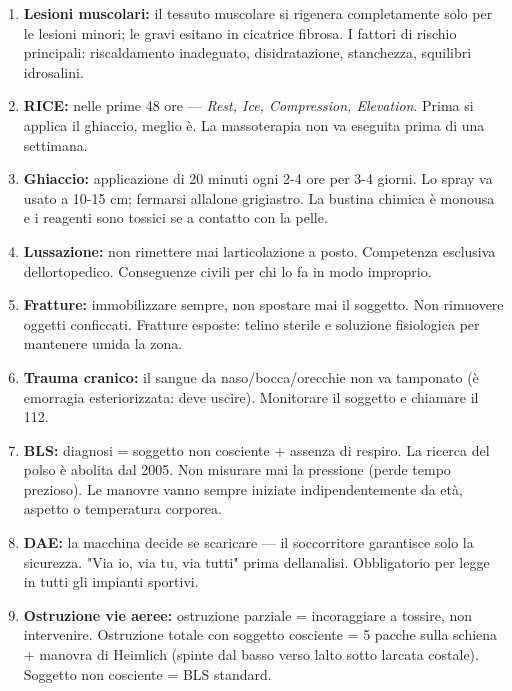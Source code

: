 \documentclass[a4paper,11pt]{article}
\begin{document}
\begin{enumerate}
      \item
            \textbf{Lesioni muscolari:} il tessuto muscolare si rigenera
            completamente solo per le lesioni minori; le gravi esitano in
            cicatrice fibrosa. I fattori di rischio principali: riscaldamento
            inadeguato, disidratazione, stanchezza, squilibri idrosalini.
      \item
            \textbf{RICE:} nelle prime 48 ore --- \emph{Rest, Ice, Compression,
                  Elevation}. Prima si applica il ghiaccio, meglio è. La massoterapia
            non va eseguita prima di una settimana.
      \item
            \textbf{Ghiaccio:} applicazione di 20 minuti ogni 2-4 ore per 3-4
            giorni. Lo spray va usato a 10-15 cm; fermarsi
            all\textquotesingle alone grigiastro. La bustina chimica è monousa e i
            reagenti sono tossici se a contatto con la pelle.
      \item
            \textbf{Lussazione:} non rimettere mai l\textquotesingle articolazione
            a posto. Competenza esclusiva dell\textquotesingle ortopedico.
            Conseguenze civili per chi lo fa in modo improprio.
      \item
            \textbf{Fratture:} immobilizzare sempre, non spostare mai il soggetto.
            Non rimuovere oggetti conficcati. Fratture esposte: telino sterile e
            soluzione fisiologica per mantenere umida la zona.
      \item
            \textbf{Trauma cranico:} il sangue da naso/bocca/orecchie non va
            tamponato (è emorragia esteriorizzata: deve uscire). Monitorare il
            soggetto e chiamare il 112.
      \item
            \textbf{BLS:} diagnosi = soggetto non cosciente + assenza di respiro.
            La ricerca del polso è abolita dal 2005. Non misurare mai la pressione
            (perde tempo prezioso). Le manovre vanno sempre iniziate
            indipendentemente da età, aspetto o temperatura corporea.
      \item
            \textbf{DAE:} la macchina decide se scaricare --- il soccorritore
            garantisce solo la sicurezza. "Via io, via tu, via tutti" prima
            dell\textquotesingle analisi. Obbligatorio per legge in tutti gli
            impianti sportivi.
      \item
            \textbf{Ostruzione vie aeree:} ostruzione parziale = incoraggiare a
            tossire, non intervenire. Ostruzione totale con soggetto cosciente = 5
            pacche sulla schiena + manovra di Heimlich (spinte dal basso verso
            l\textquotesingle alto sotto l\textquotesingle arcata costale).
            Soggetto non cosciente = BLS standard.
\end{enumerate}
\end{document}
